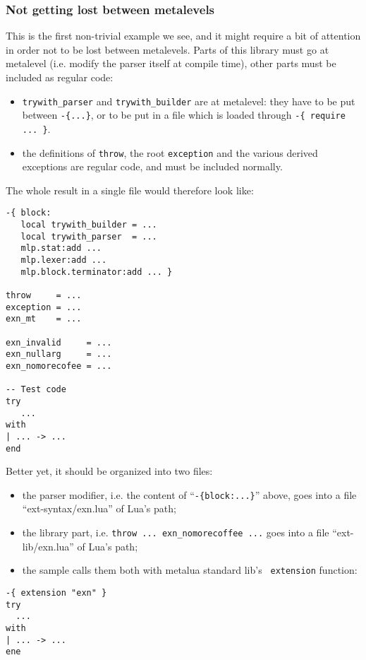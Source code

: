 \subsubsection{Not getting lost between metalevels}
This is the first non-trivial example we see, and it might require a
bit of attention in order not to be lost between metalevels. Parts of
this library must go at metalevel (i.e. modify the parser itself at
compile time), other parts must be included as regular code:
\begin{itemize}
\item {\tt trywith\_parser} and {\tt trywith\_builder} are at metalevel:
  they have to be put between \verb|-{...}|, or to be put in a file
  which is loaded through \verb|-{ require ... }|. 
\item the definitions of {\tt throw}, the root {\tt exception} and the
  various derived exceptions are regular code, and must be included normally.
\end{itemize}

The whole result in a single file would therefore look like:

\begin{verbatim}
-{ block:
   local trywith_builder = ...
   local trywith_parser  = ...
   mlp.stat:add ...
   mlp.lexer:add ...
   mlp.block.terminator:add ... }

throw     = ...
exception = ...
exn_mt    = ...

exn_invalid     = ...
exn_nullarg     = ...
exn_nomorecofee = ...

-- Test code
try
   ...
with
| ... -> ...
end
\end{verbatim}

Better yet, it should be organized into two files:
\begin{itemize}
\item the parser modifier, i.e. the content of ``{\tt-\{block:...\}}''
  above, goes into a file ``ext-syntax/exn.lua'' of Lua's path;
\item the library part, i.e. {\tt throw ... exn\_nomorecoffee ...}
  goes into a file ``ext-lib/exn.lua'' of Lua's path;
\item the sample calls them both with metalua standard lib's {\tt
extension} function:
\end{itemize}

\begin{verbatim}
-{ extension "exn" }
try
  ...
with
| ... -> ...
ene
\end{verbatim}

